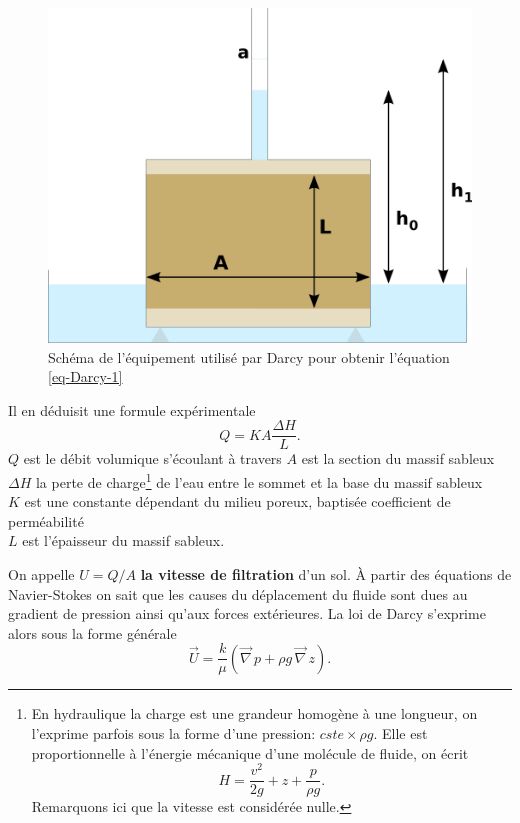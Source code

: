 \documentclass[a4paper,11pt]{article}
\numberwithin{equation}{section}
\begin{document}
\begin{figure}[H]
	\centering\includegraphics[scale=0.4]{darcy.png}
	\caption{Schéma de l'équipement utilisé par Darcy pour obtenir l'équation \eqref{eq-Darcy-1}}
	\label{fig-Darcy}
\end{figure}

Il en déduisit une formule expérimentale
\begin{equation}
	\label{eq-Darcy-1}
	Q=KA\frac{\Delta H}{L}.
\end{equation}
$Q$ est le débit volumique s'écoulant à travers  
$A$ est la section du massif sableux\\
$\Delta H$ la perte de charge\footnote{En hydraulique la charge est une grandeur homogène à une longueur, on l'exprime parfois sous la forme d'une pression: $cste\times\rho g$. Elle est proportionnelle à l'énergie mécanique d'une molécule de fluide, on écrit \[H=\frac{v^2}{2g}+ z+ \frac{p}{\rho g}.\] Remarquons ici que la vitesse est considérée nulle.} de l'eau entre le sommet et la base du massif sableux\\
$K$ est une constante dépendant du milieu poreux, baptisée coefficient de perméabilité\\
$L$ est l'épaisseur du massif sableux.



\vspace{0.7cm}

On appelle $U=Q/A$ \textbf{la vitesse de filtration} d'un sol. À partir des équations de Navier-Stokes on sait que les causes du déplacement du fluide sont dues au gradient de pression ainsi qu'aux forces extérieures. La loi de Darcy s'exprime alors sous la forme générale
\begin{equation}
	\label{eq-Darcy}
	\overrightarrow{U}=\frac{k}{\mu }(\overrightarrow{\nabla}\, p+\rho g \,\overrightarrow{\nabla}\, z).
\end{equation} 
\end{document}
